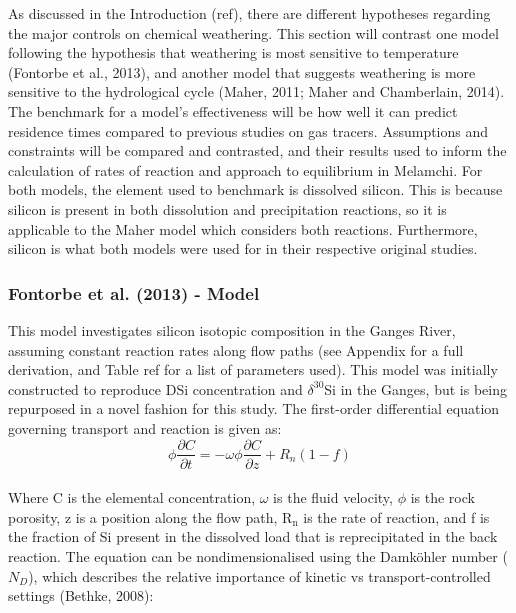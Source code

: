 As discussed in the Introduction (ref), there are different hypotheses regarding the major controls on chemical weathering. This section will contrast one model following the hypothesis that weathering is most sensitive to temperature (Fontorbe et al., 2013), and another model that suggests weathering is more sensitive to the hydrological cycle (Maher, 2011; Maher and Chamberlain, 2014). The benchmark for a model's effectiveness will be how well it can predict residence times compared to previous studies on gas tracers. Assumptions and constraints will be compared and contrasted, and their results used to inform the calculation of rates of reaction and approach to equilibrium in Melamchi. For both models, the element used to benchmark is dissolved silicon. This is because silicon is present in both dissolution and precipitation reactions, so it is applicable to the Maher model which considers both reactions. Furthermore, silicon is what both models were used for in their respective original studies.

\subsubsection*{Fontorbe et al. (2013) - Model}

This model investigates silicon isotopic composition in the Ganges River, assuming constant reaction rates along flow paths (see Appendix for a full derivation, and Table ref for a list of parameters used). This model was initially constructed to reproduce DSi concentration and $\delta^{30}$Si in the Ganges, but is being repurposed in a novel fashion for this study. The first-order differential equation governing transport and reaction is given as:\\

    \begin{equation}
    \phi \frac{\partial C}{\partial t} = -\omega \phi \frac{\partial C}{\partial z} + R_n(1-f)
    \end{equation}\\

Where C is the elemental concentration, $\omega$ is the fluid velocity, $\phi$ is the rock porosity, z is a position along the flow path, R$_\text{n}$ is the rate of reaction, and f is the fraction of Si present in the dissolved load that is reprecipitated in the back reaction. The equation can be nondimensionalised using the Damköhler number (\(N_D\)), which describes the relative importance of kinetic vs transport-controlled settings (Bethke, 2008):\\

